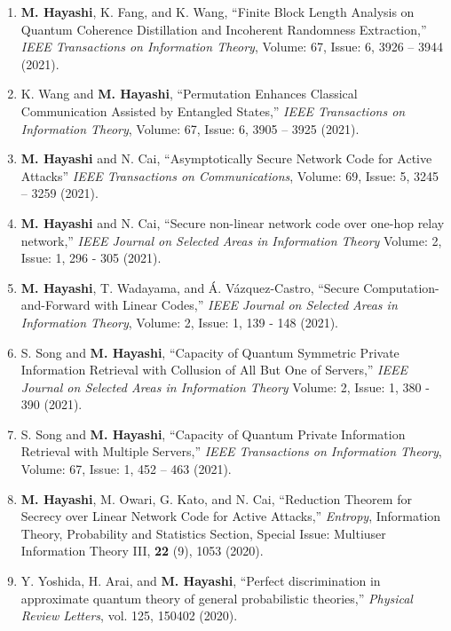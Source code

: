 \documentclass[a4paper,12pt,oneside]{article}
\begin{document}
\begin{enumerate}
\item
\textbf{M. Hayashi}, K. Fang, and K. Wang,
``Finite Block Length Analysis on Quantum Coherence Distillation and Incoherent Randomness Extraction,''
{\em IEEE Transactions on Information Theory},
Volume: 67, Issue: 6, 3926 -- 3944 (2021).

\item
K. Wang and \textbf{M. Hayashi},
``Permutation Enhances Classical Communication Assisted by Entangled States,''
{\em IEEE Transactions on Information Theory},
Volume: 67, Issue: 6, 3905 -- 3925 (2021).

\item
\textbf{M. Hayashi} and N. Cai,
``Asymptotically Secure Network Code for Active Attacks''
{\em IEEE Transactions on Communications},
Volume: 69, Issue: 5, 3245 -- 3259 (2021).

\item  
\textbf{M. Hayashi} and N. Cai,
``Secure non-linear network code over one-hop relay network,''
{\em IEEE Journal on Selected Areas in Information Theory}
Volume: 2, Issue: 1, 296 - 305 (2021).

\item  
\textbf{M. Hayashi}, T. Wadayama, and \'{A}. V\'{a}zquez-Castro,
``Secure Computation-and-Forward with Linear Codes,''
{\em IEEE Journal on Selected Areas in Information Theory},
Volume: 2, Issue: 1, 139 - 148 (2021).

\item  
S. Song and \textbf{M. Hayashi},
``Capacity of Quantum Symmetric Private Information Retrieval with Collusion of All But One of Servers,''
{\em IEEE Journal on Selected Areas in Information Theory}
Volume: 2, Issue: 1, 380 - 390 (2021).

\item  
S. Song and \textbf{M. Hayashi},
``Capacity of Quantum Private Information Retrieval with Multiple Servers,''
{\em IEEE Transactions on Information Theory}, 
Volume: 67, Issue: 1, 452 -- 463 (2021). 

\item  
\textbf{M. Hayashi}, M. Owari, G. Kato, and N. Cai,
``Reduction Theorem for Secrecy over Linear Network
Code for Active Attacks,''
{\em Entropy}, Information Theory, Probability and Statistics Section, Special Issue: Multiuser Information Theory III,  
{\bf 22} (9), 1053 (2020).

\item  
Y. Yoshida, H. Arai, and \textbf{M. Hayashi},
``Perfect discrimination in approximate quantum theory of general probabilistic theories,''
{\em Physical Review Letters}, 
vol. 125, 150402 (2020).


\end{enumerate}
\end{document}
